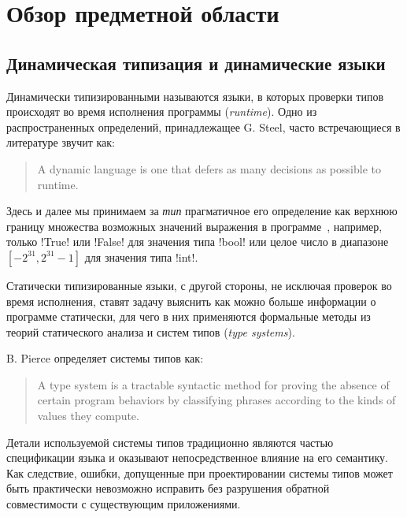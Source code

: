 \chapter{Обзор предметной области}

\section{Динамическая типизация и динамические языки}

Динамически типизированными называются языки, в которых проверки типов
происходят во время исполнения программы (\emph{runtime}). Одно из
распространенных определений, принадлежащее G. Steel, часто встречающиеся
в литературе звучит как:

\begin{quote}
  A dynamic language is one that defers as many decisions as possible to
  runtime.
\end{quote}


Здесь и далее мы принимаем за \emph{тип} прагматичное его определение как
верхнюю границу множества возможных значений выражения в
программе~\cite{Cardelli2004}, например, только !True! или !False! для значения
типа !bool! или целое число в диапазоне $[-2^31, 2^31-1]$ для значения типа
!int!.

Статически типизированные языки, с другой стороны, не исключая проверок во время
исполнения, ставят задачу выяснить как можно больше информации о программе
статически, для чего в них применяются формальные методы из теорий статического
анализа и систем типов (\emph{type systems}). 

B. Pierce определяет системы типов как:

\begin{quote}
  A type system is a tractable syntactic method for proving the absence of certain
  program behaviors by classifying phrases according to the kinds of values they
  compute.
\end{quote}

Детали используемой системы типов традиционно являются частью спецификации языка
и оказывают непосредственное влияние на его семантику. Как следствие, ошибки,
допущенные при проектировании системы типов может быть практически невозможно
исправить без разрушения обратной совместимости с существующим приложениями.

